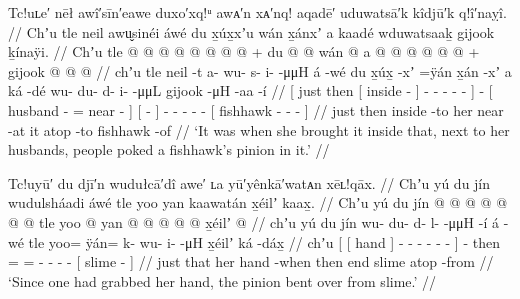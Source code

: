 \ex\label{ex:89-100-husbands-poke-quill}%
%
\begingl
	\glpreamble	Tc!uʟe′ nēł awî′sīn′eawe duxo′xq!ᵘ awᴀ′n xᴀ′nq! aqadē′ uduwatsā′k kîdjū′k q!î′naỵî. //
	\glpreamble	Chʼu tle neil awu̬sinéi áwé du x̱úx̱xʼu wán x̱ánxʼ a kaadé wduwatsaaḵ gijook ḵínaÿi. //
	\gla	{} Chʼu tle {}  @ {} {}
			 @ {} @ {} @ {} @ {} @ {} @ {} {}
		 @ {} +
		{} du  @ {} @ \•wán  @ {} {}
		{} a  @ {} {}
		 @ {} @ {} @ {} @ {} @ {} +
		{} gijook  @ {} @ {} @ {} {} //
	\glb	{} chʼu tle {} neil -t {}
			a- wu- s- i-  -μμH {} {}
		á -wé
		{} du x̱úx̱ -xʼ =ÿán x̱án -xʼ {}
		{} a ká -dé {}
		wu- du- d- i-  -μμL
		{} gijook  -μH -aa -í {} //
	\glc	{}[ just then {}[ inside - {}]
			- - - -  - \· {}]
		 -
		{}[  husband - = near - {}]
		{}[   - {}]
		- - - -  -
		{}[ fishhawk  - - - {}] //
	\gld	{} just then {} inside -to {}
			 {} {} {} {} {} {} {}
		 {}
		{} her  {} {} near -at {}
		{} it atop -to {}
		 {} {} {} {} {}
		{} fishhawk  {} {} -of {} //
	\glft	‘It was when she brought it inside that, next to her husbands, people poked a fishhawk’s pinion in it.’
		//
\endgl
\xe

\ex\label{ex:89-101-hand-caught-bent-quill}%
%
\begingl
	\glpreamble	Tc!uyū′ du djī′n wudułcā′dî awe′ ʟa yū′yênkā′watᴀn xēʟ!qāx. //
	\glpreamble	Chʼu yú du jín wudulsháadi áwé tle yoo yan kaawatán x̱éilʼ kaax̱. //
	\gla	Chʼu {} {} yú du jín {}
			 @ {} @ {} @ {} @ {} @ {} @ {} {}
		 @ {}
		tle yoo @ yan @  @ {} @ {} @ {} @ {}
		{} x̱éilʼ  @ {} {} //
	\glb	chʼu {} {} yú du jín {}
			wu- du- d- l-  -μμH -í {}
		á -wé
		tle yoo= ÿán= k- wu- i-  -μH
		{} x̱éilʼ ká -dáx̱ {} //
	\glc	chʼu {}[ {}[   hand {}]
			- - - -  - - {}]
		 -
		then = = - - -  -
		{}[ slime  - {}] //
	\gld	just {} {} that her hand {}
			 {} {} {} {} {} -when {}
		 {}
		then  end  {} {} {} {}
		{} slime atop -from {} //
	\glft	‘Since one had grabbed her hand, the pinion bent over from slime.’
		//
\endgl
\xe

